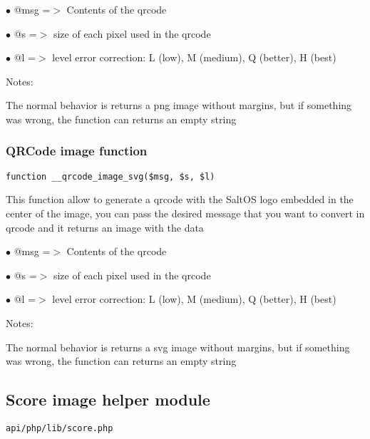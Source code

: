 \documentclass[a4paper]{article}
\begin{document}
\begin{compactitem}
\item[\color{myblue}$\bullet$] @msg =$>$ Contents of the qrcode
\item[\color{myblue}$\bullet$] @s   =$>$ size of each pixel used in the qrcode
\item[\color{myblue}$\bullet$] @l   =$>$ level error correction: L (low), M (medium), Q (better), H (best)
\end{compactitem}

Notes:

The normal behavior is returns a png image without margins, but if something
was wrong, the function can returns an empty string

\hypertarget{toc522}{}
\subsubsection{QRCode image function}

\begin{lstlisting}
function __qrcode_image_svg($msg, $s, $l)
\end{lstlisting}

This function allow to generate a qrcode with the SaltOS logo embedded
in the center of the image, you can pass the desired message that you
want to convert in qrcode and it returns an image with the data

\begin{compactitem}
\item[\color{myblue}$\bullet$] @msg =$>$ Contents of the qrcode
\item[\color{myblue}$\bullet$] @s   =$>$ size of each pixel used in the qrcode
\item[\color{myblue}$\bullet$] @l   =$>$ level error correction: L (low), M (medium), Q (better), H (best)
\end{compactitem}

Notes:

The normal behavior is returns a svg image without margins, but if something
was wrong, the function can returns an empty string

\hypertarget{toc523}{}
\subsection{Score image helper module}

\begin{lstlisting}
api/php/lib/score.php
\end{lstlisting}
\end{document}
